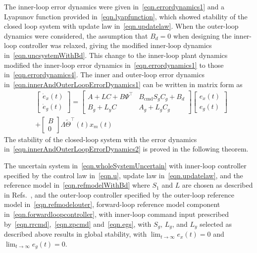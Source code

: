 \documentclass[journal]{IEEEtran}
\theoremstyle{innercustomthm}
\begin{document}
  The inner-loop error dynamics were given in\ \eqref{eqn.errordynamics1} and a Lyapunov function provided in\ \eqref{eqn.lyapfunction}, which showed stability of the closed loop system with update law in\ \eqref{eqn.updatelaw}.
  When the outer-loop dynamics were considered, the assumption that $B_{d}=0$ when designing the inner-loop controller was relaxed, giving the modified inner-loop dynamics in\ \eqref{eqn.uncsystemWithBd}.
  This change to the inner-loop plant dynamics modified the inner-loop error dynamics in\ \eqref{eqn.errordynamics1} to those in\ \eqref{eqn.errordynamics4}.
  The inner and outer-loop error dynamics in\ \eqref{eqn.innerAndOuterLoopErrorDynamics1} can be written in matrix form as
  {%
    \small
    \begin{equation}
      \label{eqn.innerAndOuterLoopErrorDynamics2}
      \begin{split}
        &
        \begin{bmatrix}
          \dot{e}_{x}(t) \\
          \dot{e}_{g}(t)
        \end{bmatrix}
        =
        \begin{bmatrix}
          A+LC+B\Psi^{\top} & B_{\text{cmd}}S_{g}C_{g} + B_{d} \\
          B_{g}+L_{y}C & A_{g}+L_{g}C_{g}
        \end{bmatrix}
        \begin{bmatrix}
          e_{x}(t) \\
          e_{g}(t)
        \end{bmatrix} \\
        & +
        \begin{bmatrix}
          B \\
          0
        \end{bmatrix}
        \Lambda\widetilde{\Theta}^{\top}(t)x_{m}(t)
      \end{split}
    \end{equation}
  }%
  The stability of the closed-loop system with the error dynamics in\ \eqref{eqn.innerAndOuterLoopErrorDynamics2} is proved in the following theorem.

  \begin{thm-dan}\label{thm.outerloop}
    The uncertain system in\ \eqref{eqn.wholeSystemUncertain} with inner-loop controller specified by the control law in\ \eqref{eqn.u}, update law in\ \eqref{eqn.updatelaw}, and the reference model in\ \eqref{eqn.refmodelWithBd} where $S_{1}$ and $L$ are chosen as described in Refs.\ \cite{wiese.gnc.2015, wiese.jgcd.2015}, and the outer-loop controller specified by the outer-loop reference model in\ \eqref{eqn.refmodelouter}, forward-loop reference model component in\ \eqref{eqn.forwardloopcontroller}, with inner-loop command input prescribed by\ \eqref{eqn.rrcmd},\ \eqref{eqn.zpcmd} and\ \eqref{eqn.egs}, with $S_{g}$, $L_{g}$, and $L_{y}$ selected as described above results in global stability, with $\lim_{t\rightarrow\infty}e_{x}(t)=0$ and $\lim_{t\rightarrow\infty}e_{g}(t)=0$.
  \end{thm-dan}
\end{document}
